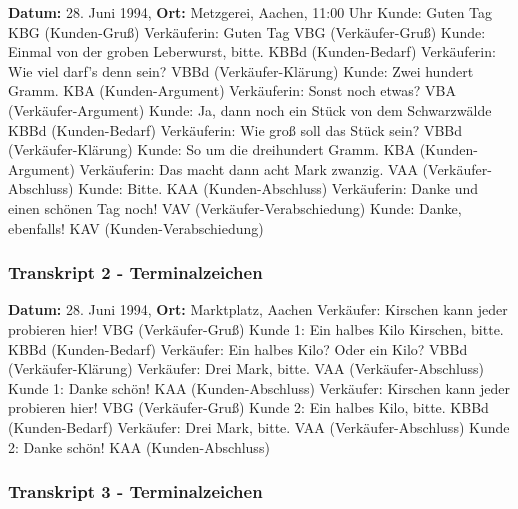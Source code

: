 \documentclass[
]{article}
\begin{document}
\textbf{Datum:} 28. Juni 1994, \textbf{Ort:} Metzgerei, Aachen, 11:00
Uhr\textbar{} Kunde: Guten Tag \textbar{} KBG (Kunden-Gruß) \textbar{}
Verkäuferin: Guten Tag \textbar{} VBG (Verkäufer-Gruß) \textbar{} Kunde:
Einmal von der groben Leberwurst, bitte. \textbar{} KBBd (Kunden-Bedarf)
\textbar{} Verkäuferin: Wie viel darf's denn sein? \textbar{} VBBd
(Verkäufer-Klärung) \textbar{} Kunde: Zwei hundert Gramm. \textbar{} KBA
(Kunden-Argument) \textbar{} Verkäuferin: Sonst noch etwas? \textbar{}
VBA (Verkäufer-Argument) \textbar{} Kunde: Ja, dann noch ein Stück von
dem Schwarzwälde\textbar{} KBBd (Kunden-Bedarf) \textbar{} Verkäuferin:
Wie groß soll das Stück sein? \textbar{} VBBd (Verkäufer-Klärung)
\textbar{} Kunde: So um die dreihundert Gramm. \textbar{} KBA
(Kunden-Argument) \textbar{} Verkäuferin: Das macht dann acht Mark
zwanzig. \textbar{} VAA (Verkäufer-Abschluss) \textbar{} Kunde: Bitte.
\textbar{} KAA (Kunden-Abschluss) \textbar{} Verkäuferin: Danke und
einen schönen Tag noch! \textbar{} VAV (Verkäufer-Verabschiedung)
\textbar{} Kunde: Danke, ebenfalls! \textbar{} KAV
(Kunden-Verabschiedung)\textbar{}

\subsubsection{\texorpdfstring{\textbf{Transkript 2 -
Terminalzeichen}}{Transkript 2 - Terminalzeichen}}\label{transkript-2---terminalzeichen}

\textbf{Datum:} 28. Juni 1994, \textbf{Ort:} Marktplatz,
Aachen\textbar{} Verkäufer: Kirschen kann jeder probieren hier!
\textbar{} VBG (Verkäufer-Gruß) \textbar{} Kunde 1: Ein halbes Kilo
Kirschen, bitte. \textbar{} KBBd (Kunden-Bedarf) \textbar{} Verkäufer:
Ein halbes Kilo? Oder ein Kilo? \textbar{} VBBd (Verkäufer-Klärung)
\textbar{} Verkäufer: Drei Mark, bitte. \textbar{} VAA
(Verkäufer-Abschluss) \textbar{} Kunde 1: Danke schön! \textbar{} KAA
(Kunden-Abschluss) \textbar{} Verkäufer: Kirschen kann jeder probieren
hier! \textbar{} VBG (Verkäufer-Gruß) \textbar{} Kunde 2: Ein halbes
Kilo, bitte. \textbar{} KBBd (Kunden-Bedarf) \textbar{} Verkäufer: Drei
Mark, bitte. \textbar{} VAA (Verkäufer-Abschluss) \textbar{} Kunde 2:
Danke schön! \textbar{} KAA (Kunden-Abschluss)

\subsubsection{\texorpdfstring{\textbf{Transkript 3 -
Terminalzeichen}}{Transkript 3 - Terminalzeichen}}\label{transkript-3---terminalzeichen}
\end{document}
